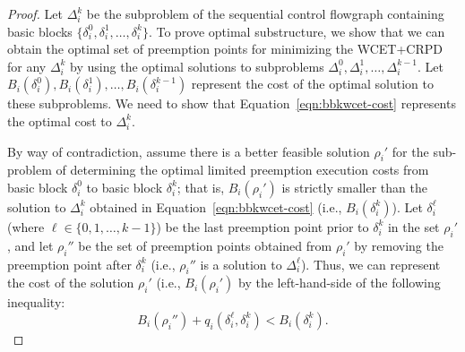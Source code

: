 \begin{proof}
Let $\Delta_i^k$ be the subproblem of the sequential control flowgraph containing basic blocks $\{\delta_i^0, \delta_i^1, \ldots, \delta_i^{k}\}$.
To prove optimal substructure, we show that we can obtain the optimal set of preemption points for minimizing the WCET+CRPD for any $\Delta_i^k$ by using the optimal solutions to subproblems $\Delta_i^0, \Delta_i^1, \ldots, \Delta_i^{k-1}$.  Let $B_i(\delta_i^0), B_i(\delta_i^1), \ldots, B_i(\delta_i^{k-1})$ represent the cost of the optimal solution to these subproblems.  We need to show that Equation~\ref{eqn:bbkwcet-cost} represents the optimal cost to $\Delta_i^k$.

By way of contradiction, assume there is a better feasible solution $\rho_{i}'$ for the sub-problem of determining the optimal limited preemption execution costs from basic block $\delta_{i}^{0}$ to basic block $\delta_{i}^{k}$; that is, $B_{i}(\rho_{i}')$ is strictly smaller than the solution to $\Delta_i^k$ obtained in Equation~\ref{eqn:bbkwcet-cost} (i.e.,  $B_{i}(\delta_{i}^{k})$).  Let $\delta_i^{\ell}$ (where $\ell \in \{0, 1, \ldots, k-1\}$) be the last preemption point prior to $\delta_i^k$ in the set $\rho_{i}'$, and let $\rho_{i}''$ be the set of preemption points obtained from $\rho_{i}'$ by removing the preemption point after $\delta_i^k$ (i.e., $\rho_{i}''$ is a solution to $\Delta_i^{\ell}$).  Thus, we can represent the cost of the solution $\rho_{i}'$ (i.e., $B_i(\rho_{i}')$ by the left-hand-side of the following inequality:
\begin{equation}\label{eqn:bi-deltai-lb}
    B_i(\rho_{i}'') + q_i(\delta_i^{\ell}, \delta_i^k) < B_i(\delta_i^k).
\end{equation}


\end{proof}
